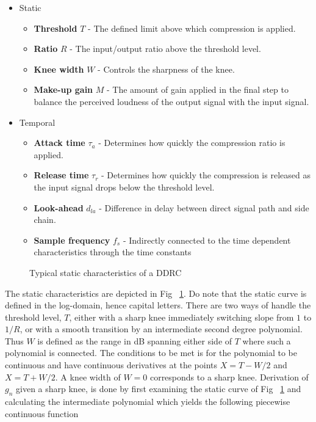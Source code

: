 \documentclass[../main2.tex]{subfiles}
\providecommand{\rootdir}{..}
\begin{document}
\begin{itemize}
\item{Static}
	\begin{itemize}
	\item \textbf{Threshold} $T$ - The defined limit above which compression is applied.
	\item \textbf{Ratio} $R$ - The input/output ratio above the threshold level.
	\item \textbf{Knee width}  $W$ - Controls the sharpness of the knee.
	\item \textbf{Make-up gain}  $M$ - The amount of gain applied in the final step to balance the perceived loudness of the output signal with the input signal.
\end{itemize}
\item{Temporal}
	\begin{itemize}
	\item \textbf{Attack time} $\tau_{a}$ - Determines how quickly the compression ratio is applied.
	\item \textbf{Release time} $\tau_{r}$ - Determines how quickly the compression is released as the input signal drops below the threshold level.
	\item \textbf{Look-ahead} $d_{la}$ - Difference in delay between direct signal path and side chain. 
	\item \textbf{Sample frequency} $f_{s}$ - Indirectly connected to the time dependent characteristics through the time constants
	\end{itemize}
\end{itemize}
\begin{figure}
\centerline{}
\caption{Typical static characteristics of a DDRC}
\label{fig:typical_static_detailed}
\end{figure}
The static characteristics are depicted in Fig ~\ref{fig:typical_static_detailed}. Do note that the static curve is defined in the log-domain, hence capital letters. There are two ways of handle the threshold level, $T$, either with a sharp knee immediately switching slope from $1$ to $1/R$, or with a smooth transition by an intermediate second degree polynomial\cite{frindle1996implementation}\cite{reiss2012tutorial}. Thus $W$ is defined as the range in dB spanning either side of $T$ where such a polynomial is connected. The conditions to be met is for the polynomial to be continuous and have continuous derivatives at the points $X=T-W/2$ and $X=T+W/2$. A knee width of $W=0$ corresponds to a sharp knee. Derivation of $g_n$ given a sharp knee, is done by first examining the static curve of Fig ~\ref{fig:typical_static_detailed} and calculating the intermediate polynomial which yields the following piecewise continuous function
\end{document}
